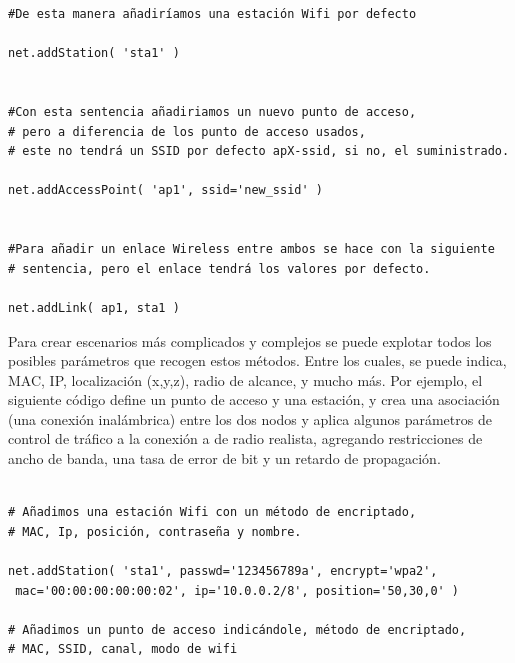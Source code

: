 \begin{verbatim}
#De esta manera añadiríamos una estación Wifi por defecto

net.addStation( 'sta1' )


#Con esta sentencia añadiriamos un nuevo punto de acceso,
# pero a diferencia de los punto de acceso usados, 
# este no tendrá un SSID por defecto apX-ssid, si no, el suministrado.

net.addAccessPoint( 'ap1', ssid='new_ssid' )


#Para añadir un enlace Wireless entre ambos se hace con la siguiente
# sentencia, pero el enlace tendrá los valores por defecto.

net.addLink( ap1, sta1 )

\end{verbatim}

Para crear escenarios más complicados y complejos se puede explotar todos los posibles parámetros que recogen estos métodos. Entre los cuales, se puede indica, MAC, IP, localización (x,y,z), radio de alcance, y mucho más. Por ejemplo, el siguiente código define un punto de acceso y una estación, y crea una asociación (una conexión inalámbrica) entre los dos nodos y aplica algunos parámetros de control de tráfico a la conexión a de radio realista, agregando restricciones de ancho de banda, una tasa de error de bit y un
retardo de propagación.

\begin{verbatim}

# Añadimos una estación Wifi con un método de encriptado,
# MAC, Ip, posición, contraseña y nombre.

net.addStation( 'sta1', passwd='123456789a', encrypt='wpa2',
 mac='00:00:00:00:00:02', ip='10.0.0.2/8', position='50,30,0' )
 
# Añadimos un punto de acceso indicándole, método de encriptado,
# MAC, SSID, canal, modo de wifi
\end{verbatim}

